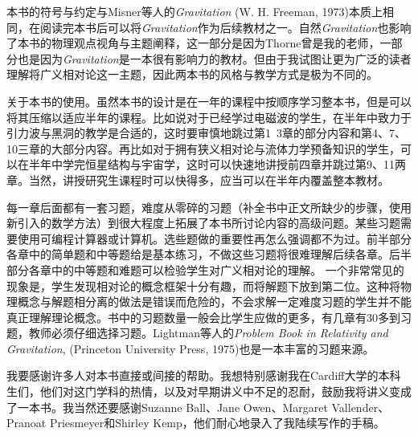 本书的符号与约定与Misner等人的\textit{Gravitation} (W. H. Freeman, 1973)本质上相同，在阅读完本书后可以将\textit{Gravitation}作为后续教材之一。自然\textit{Gravitation}也影响了本书的物理观点视角与主题阐释，这一部分是因为Thorne曾是我的老师，一部分也是因为\textit{Gravitation}是一本很有影响力的教材。但由于我试图让更为广泛的读者理解将广义相对论这一主题，因此两本书的风格与教学方式是极为不同的。

关于本书的使用。虽然本书的设计是在一年的课程中按顺序学习整本书，但是可以将其压缩以适应半年的课程。比如说对于已经学过电磁波的学生，在半年中致力于引力波与黑洞的教学是合适的，这时要审慎地跳过第1~3章的部分内容和第4、7、10三章的大部分内容。再比如对于拥有狭义相对论与流体力学预备知识的学生，可以在半年中学完恒星结构与宇宙学，这时可以快速地讲授前四章并跳过第9、11两章。当然，讲授研究生课程时可以快得多，应当可以在半年内覆盖整本教材。

每一章后面都有一套习题，难度从零碎的习题（补全书中正文所缺少的步骤，使用新引入的数学方法）到很大程度上拓展了本书所讨论内容的高级问题。某些习题需要使用可编程计算器或计算机。选些题做的重要性再怎么强调都不为过。前半部分各章中的简单题和中等题给是基本练习，不做这些习题将很难理解后续各章。后半部分各章中的中等题和难题可以检验学生对广义相对论的理解。%
一个非常常见的现象是，学生发现相对论的概念框架十分有趣，而将解题下放到第二位。这种将物理概念与解题相分离的做法是错误而危险的，不会求解一定难度习题的学生并不能真正理解理论概念。书中的习题数量一般会比学生应做的更多，有几章有30多到习题，教师必须仔细选择习题。Lightman等人的\textit{Problem Book in Relativity and Gravitation}, (Princeton University Press, 1975)也是一本丰富的习题来源。

我要感谢许多人对本书直接或间接的帮助。我想特别感谢我在Cardiff大学的本科生们，他们对这门学科的热情，以及对早期讲义中不足的忍耐，鼓励我将讲义变成了一本书。我当然还要感谢Suzanne Ball、Jane Owen、Margaret Vallender、Pranoat Priesmeyer和Shirley Kemp，他们耐心地录入了我陆续写作的手稿。
